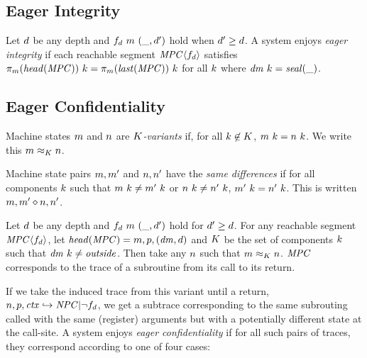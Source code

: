 \documentclass[acmsmall,review,anonymous]{acmart}\settopmatter{printfolios=true,printccs=false,printacmref=false}
\begin{document}
\subsection{Eager Integrity}

 Let \(d\) be any depth and \(f_d ~ m ~ (\_, d')\) hold when
\(d' \geq d\). A system enjoys {\em eager integrity} if each reachable segment
\(\mathit{MPC} \langle f_d \rangle\) satisfies \(\pi_m(\mathit{head}(\mathit{MPC})) ~ k =
\pi_m(\mathit{last}(\mathit{MPC})) ~ k\) for all \(k\) where \(\mathit{dm} ~ k =
\mathit{seal(\_)}\).

\subsection{Eager Confidentiality}

 Machine states \(m\) and \(n\) are {\em \(K\)-variants} if, for
all \(k \not \in K\), \(m ~ k = n ~ k\). We write
this \(m \approx_K n\).

 Machine state pairs \(m,m'\) and \(n,n'\) have the {\em same differences}
if for all components \(k\) such that \(m ~ k \not = m' ~ k\) or
\(n ~ k \not = n' ~ k\), \(m' ~ k = n' ~ k\).
This is written \(m,m' \diamond n,n'\).

 Let \(d\) be any depth and \(f_d ~ m ~ (\_, d')\) hold for
\(d' \geq d\). For any reachable segment \(\mathit{MPC} \langle f_d \rangle\),
let \(\mathit{head}(\mathit{MPC}) = m,p,(\mathit{dm},d)\) and
\(K\) be the set of components \(k\) such that \(\mathit{dm} ~ k \not = \mathit{outside}\).
Then take any \(n\) such that \(m \approx_K n\). \(\mathit{MPC}\) corresponds to the
trace of a subroutine from its call to its return.

If we take the induced trace from this variant until a return,
\(n,p,\mathit{ctx} \hookrightarrow \mathit{NPC} | \neg f_d\), we get a subtrace corresponding
to the same subrouting called with the same (register) arguments but with a potentially different
state at the call-site. A system enjoys {\em eager confidentiality} if for all such pairs of traces,
they correspond according to one of four cases:
\end{document}
